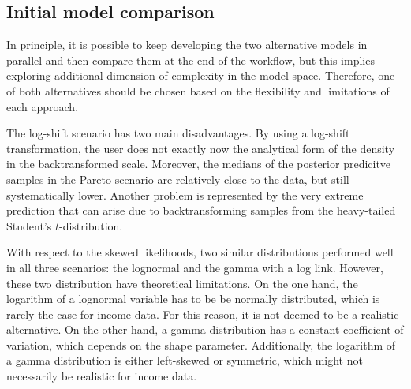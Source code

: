\subsection{Initial model comparison}

In principle, it is possible to keep developing the two alternative models in parallel and then compare them at the end of the workflow, but this implies exploring additional dimension of complexity in the model space.
Therefore, one of both alternatives should be chosen based on the flexibility and limitations of each approach.

The log-shift scenario has two main disadvantages.
By using a log-shift transformation, the user does not exactly now the analytical form of the density in the backtransformed scale.
Moreover, the medians of the posterior predicitve samples in the Pareto scenario are relatively close to the data, but still systematically lower.
Another problem is represented by the very extreme prediction that can arise due to backtransforming samples from the heavy-tailed Student's $t$-distribution.

With respect to the skewed likelihoods, two similar distributions performed well in all three scenarios: the lognormal and the gamma with a log link.
However, these two distribution have theoretical limitations.
On the one hand, the logarithm of a lognormal variable has to be be normally distributed, which is rarely the case for income data.
For this reason, it is not deemed to be a realistic alternative.
On the other hand, a gamma distribution has a constant coefficient of variation, which depends on the shape parameter.
Additionally, the logarithm of a gamma distribution is either left-skewed or symmetric, which might not necessarily be realistic for income data.

